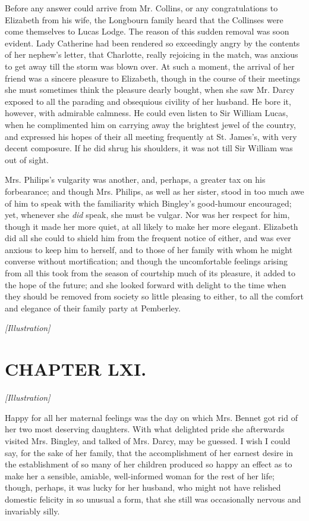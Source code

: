 \documentclass[12pt]{book}
\begin{document}
Before any answer could arrive from Mr. Collins, or any congratulations to Elizabeth from his wife, the Longbourn family heard that the Collinses were come themselves to Lucas Lodge. The reason of this sudden removal was soon evident. Lady Catherine had been rendered so exceedingly angry by the contents of her nephew's letter, that Charlotte, really rejoicing in the match, was anxious to get away till the storm was blown over. At such a moment, the arrival of her friend was a sincere pleasure to Elizabeth, though in the course of their meetings she must sometimes think the pleasure dearly bought, when she saw Mr. Darcy exposed to all the parading and obsequious civility of her husband. He bore it, however, with admirable calmness. He could even listen to Sir William Lucas, when he complimented him on carrying away the brightest jewel of the country, and expressed his hopes of their all meeting frequently at St. James's, with very decent composure. If he did shrug his shoulders, it was not till Sir William was out of sight.

Mrs. Philips's vulgarity was another, and, perhaps, a greater tax on his forbearance; and though Mrs. Philips, as well as her sister, stood in too much awe of him to speak with the familiarity which Bingley's good-humour encouraged; yet, whenever she \textit{did} speak, she must be vulgar. Nor was her respect for him, though it made her more quiet, at all likely to make her more elegant. Elizabeth did all she could to shield him from the frequent notice of either, and was ever anxious to keep him to herself, and to those of her family with whom he might converse without mortification; and though the uncomfortable feelings arising from all this took from the season of courtship much of its pleasure, it added to the hope of the future; and she looked forward with delight to the time when they should be removed from society so little pleasing to either, to all the comfort and elegance of their family party at Pemberley.

\emph{[Illustration]}

\chapter{CHAPTER LXI.}

\emph{[Illustration]}

Happy for all her maternal feelings was the day on which Mrs. Bennet got rid of her two most deserving daughters. With what delighted pride she afterwards visited Mrs. Bingley, and talked of Mrs. Darcy, may be guessed. I wish I could say, for the sake of her family, that the accomplishment of her earnest desire in the establishment of so many of her children produced so happy an effect as to make her a sensible, amiable, well-informed woman for the rest of her life; though, perhaps, it was lucky for her husband, who might not have relished domestic felicity in so unusual a form, that she still was occasionally nervous and invariably silly.
\end{document}
